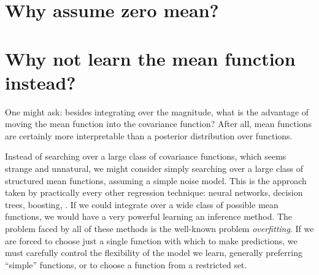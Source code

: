 


\outbpdocument{


}




\iffalse
\section{Why assume zero mean?}

\section{Why not learn the mean function instead?}
One might ask: besides integrating over the magnitude, what is the advantage of moving the mean function into the covariance function?
After all, mean functions are certainly more interpretable than a posterior distribution over functions.

Instead of searching over a large class of covariance functions, which seems strange and unnatural, we might consider simply searching over a large class of structured mean functions, assuming a simple \iid noise model.
This is the approach taken by practically every other regression technique: neural networks, decision trees, boosting, \etc.
If we could integrate over a wide class of possible mean functions, we would have a very powerful learning an inference method.
The problem faced by all of these methods is the well-known problem \emph{overfitting}.
If we are forced to choose just a single function with which to make predictions, we must carefully control the flexibility of the model we learn, generally preferring ``simple'' functions, or to choose a function from a restricted set.

